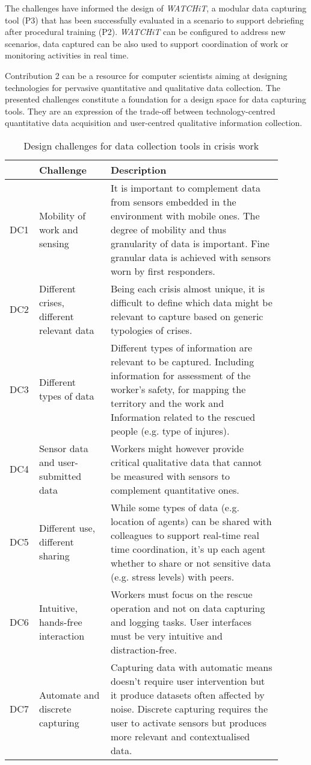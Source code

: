 The challenges have informed the design of \emph{WATCHiT}, a modular data capturing tool (P3) that has been successfully evaluated in a scenario to support debriefing after procedural training (P2). \emph{WATCHiT} can be configured to address new scenarios, data captured can be also used to support coordination of work or monitoring activities in real time.

Contribution 2 can be a resource for computer scientists aiming at designing technologies for pervasive quantitative and qualitative data collection. The presented challenges constitute a foundation for a design space for data capturing tools. They are an expression of the trade-off between technology-centred quantitative data acquisition and user-centred qualitative information collection.

\begin{table}
	[p] \centering \caption{Design challenges for data collection tools in crisis work} \label{tab:design-challenges} 
	\begin{tabular}
		{@{}p{0.05\linewidth}p{0.25\linewidth}p{0.60\linewidth}@{}} \toprule & Challenge & Description \\
		\midrule DC1 & Mobility of work and sensing & It is important to complement data from sensors embedded in the environment with mobile ones. The degree of mobility and thus granularity of data is important. Fine granular data is achieved with sensors worn by first responders. \\
		DC2 & Different crises, different relevant data & Being each crisis almost unique, it is difficult to define which data might be relevant to capture based on generic typologies of crises. \\
		DC3 & Different types of data & Different types of information are relevant to be captured. Including information for assessment of the worker’s safety, for mapping the territory and the work and Information related to the rescued people (e.g. type of injures). \\
		DC4 & Sensor data and user-submitted data & Workers might however provide critical qualitative data that cannot be measured with sensors to complement quantitative ones. \\
		DC5 & Different use, different sharing & While some types of data (e.g. location of agents) can be shared with colleagues to support real-time real time coordination, it's up each agent whether to share or not sensitive data (e.g. stress levels) with peers. \\
		DC6 & Intuitive, hands-free interaction & Workers must focus on the rescue operation and not on data capturing and logging tasks. User interfaces must be very intuitive and distraction-free. \\
		DC7 & Automate and discrete capturing & Capturing data with automatic means doesn't require user intervention but it produce datasets often affected by noise. Discrete capturing requires the user to activate sensors but produces more relevant and contextualised data. \\
		\bottomrule 
	\end{tabular}
\end{table}


